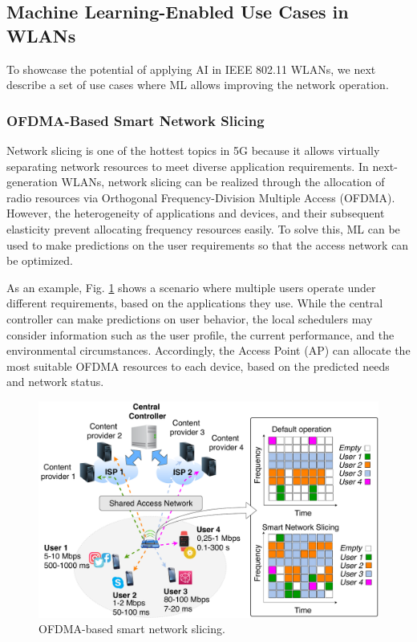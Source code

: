 \documentclass[journal]{IEEEtran}
\begin{document}
\subsection{Machine Learning-Enabled Use Cases in WLANs}
To showcase the potential of applying AI in IEEE 802.11 WLANs, we next describe a set of use cases where ML allows improving the network operation.

\subsubsection{OFDMA-Based Smart Network Slicing} 
Network slicing is one of the hottest topics in 5G because it allows virtually separating network resources to meet diverse application requirements. In next-generation WLANs, network slicing can be realized through the allocation of radio resources via Orthogonal Frequency-Division Multiple Access (OFDMA). However, the heterogeneity of applications and devices, and their subsequent elasticity prevent allocating frequency resources easily. To solve this, ML can be used to make predictions on the user requirements so that the access network can be optimized.

As an example, Fig. \ref{fig:use_cases} shows a scenario where multiple users operate under different requirements, based on the applications they use. While the central controller can make predictions on user behavior, the local schedulers may consider information such as the user profile, the current performance, and the environmental circumstances. Accordingly, the Access Point (AP) can allocate the most suitable OFDMA resources to each device, based on the predicted needs and network status.

\begin{figure}[ht!]
	\centering
	\includegraphics[width=1\columnwidth]{network_slicing_ofdma}
	\caption{OFDMA-based smart network slicing.}
	\label{fig:use_cases}
\end{figure}
\end{document}
